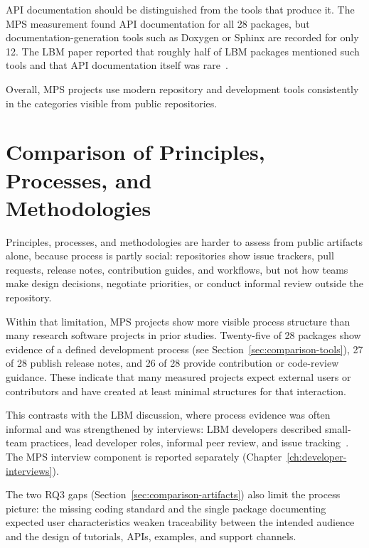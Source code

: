 API documentation should be distinguished from the tools that produce it. The MPS measurement found API documentation for all 28 packages, but documentation-generation tools such as Doxygen or Sphinx are recorded for only 12. The LBM paper reported that roughly half of LBM packages mentioned such tools and that API documentation itself was rare~\citep{Smith2024LBM}.

Overall, MPS projects use modern repository and development tools consistently in the categories visible from public repositories.

\section[Comparison of Principles, Processes, and Methodologies]{Comparison of Principles, Processes, and\\ Methodologies}
\label{sec:comparison-practices}

Principles, processes, and methodologies are harder to assess from public artifacts alone, because process is partly social: repositories show issue trackers, pull requests, release notes, contribution guides, and workflows, but not how teams make design decisions, negotiate priorities, or conduct informal review outside the repository.

Within that limitation, MPS projects show more visible process structure than many research software projects in prior studies. Twenty-five of 28 packages show evidence of a defined development process (see Section~\ref{sec:comparison-tools}), 27 of 28 publish release notes, and 26 of 28 provide contribution or code-review guidance. These indicate that many measured projects expect external users or contributors and have created at least minimal structures for that interaction.

This contrasts with the LBM discussion, where process evidence was often informal and was strengthened by interviews: LBM developers described small-team practices, lead developer roles, informal peer review, and issue tracking~\citep{Smith2024LBM}. The MPS interview component is reported separately (Chapter~\ref{ch:developer-interviews}).

The two RQ3 gaps (Section~\ref{sec:comparison-artifacts}) also limit the process picture: the missing coding standard and the single package documenting expected user characteristics weaken traceability between the intended audience and the design of tutorials, APIs, examples, and support channels.

